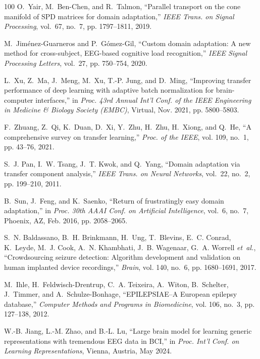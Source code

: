 \documentclass[journal]{IEEEtran}
\begin{document}
\begin{thebibliography}{100}
O.~Yair, M.~Ben-Chen, and R.~Talmon, ``Parallel transport on the cone manifold
  of {SPD} matrices for domain adaptation,'' \emph{IEEE Trans. on Signal
  Processing}, vol.~67, no.~7, pp. 1797--1811, 2019.

M.~Jiménez-Guarneros and P.~Gómez-Gil, ``Custom domain adaptation: A new
  method for cross-subject, {EEG}-based cognitive load recognition,''
  \emph{IEEE Signal Processing Letters}, vol.~27, pp. 750--754, 2020.

L.~Xu, Z.~Ma, J.~Meng, M.~Xu, T.-P. Jung, and D.~Ming, ``Improving transfer
  performance of deep learning with adaptive batch normalization for
  brain-computer interfaces,'' in \emph{Proc. 43rd Annual Int'l Conf. of the
  IEEE Engineering in Medicine \& Biology Society (EMBC)}, Virtual, Nov. 2021,
  pp. 5800--5803.

F.~Zhuang, Z.~Qi, K.~Duan, D.~Xi, Y.~Zhu, H.~Zhu, H.~Xiong, and Q.~He, ``A
  comprehensive survey on transfer learning,'' \emph{Proc. of the IEEE}, vol.
  109, no.~1, pp. 43--76, 2021.

S.~J. Pan, I.~W. Tsang, J.~T. Kwok, and Q.~Yang, ``Domain adaptation via
  transfer component analysis,'' \emph{IEEE Trans. on Neural Networks},
  vol.~22, no.~2, pp. 199--210, 2011.

B.~Sun, J.~Feng, and K.~Saenko, ``Return of frustratingly easy domain
  adaptation,'' in \emph{Proc. 30th {AAAI} Conf. on Artificial Intelligence},
  vol.~6, no.~7, Phoenix, AZ, Feb. 2016, pp. 2058--2065.

S.~N. Baldassano, B.~H. Brinkmann, H.~Ung, T.~Blevins, E.~C. Conrad, K.~Leyde,
  M.~J. Cook, A.~N. Khambhati, J.~B. Wagenaar, G.~A. Worrell \emph{et~al.},
  ``Crowdsourcing seizure detection: Algorithm development and validation on
  human implanted device recordings,'' \emph{Brain}, vol. 140, no.~6, pp.
  1680--1691, 2017.

M.~Ihle, H.~Feldwisch-Drentrup, C.~A. Teixeira, A.~Witon, B.~Schelter,
  J.~Timmer, and A.~Schulze-Bonhage, ``{EPILEPSIAE}--{A} {E}uropean epilepsy
  database,'' \emph{Computer Methods and Programs in Biomedicine}, vol. 106,
  no.~3, pp. 127--138, 2012.

W.-B. Jiang, L.-M. Zhao, and B.-L. Lu, ``Large brain model for learning generic
  representations with tremendous {EEG} data in {BCI},'' in \emph{Proc. Int'l
  Conf. on Learning Representations}, Vienna, Austria, May 2024.


\end{thebibliography}
\end{document}
